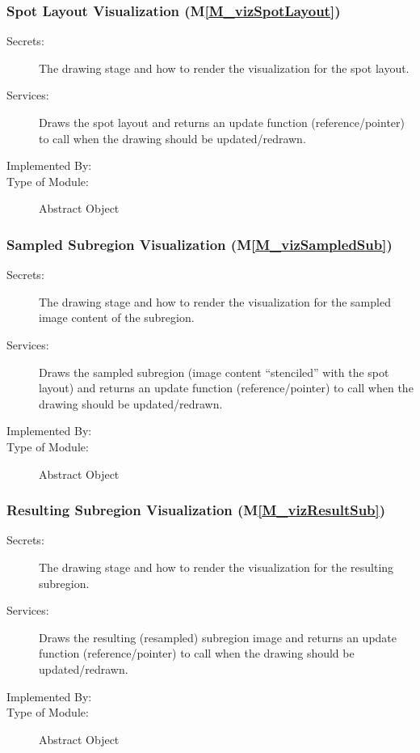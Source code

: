 \documentclass[12pt, titlepage]{article}
\newcommand{\mref}[1]{M\ref{#1}}
\begin{document}
\subsubsection{Spot Layout Visualization (\mref{M_vizSpotLayout})}
\begin{description}
\item[Secrets:] The drawing stage and how to render the visualization for the spot layout.
\item[Services:] Draws the spot layout and returns an update function (reference/pointer)
  to call when the drawing should be updated/redrawn.
\item[Implemented By:] \progname{}
\item[Type of Module:] Abstract Object
\end{description}


\subsubsection{Sampled Subregion Visualization (\mref{M_vizSampledSub})}
\begin{description}
\item[Secrets:] The drawing stage and how to render the visualization for
  the sampled image content of the subregion.
\item[Services:] Draws the sampled subregion (image content ``stenciled'' with the spot layout)
  and returns an update function (reference/pointer) to call when the drawing should be updated/redrawn.
\item[Implemented By:] \progname{}
\item[Type of Module:] Abstract Object
\end{description}


\subsubsection{Resulting Subregion Visualization (\mref{M_vizResultSub})}
\begin{description}
\item[Secrets:] The drawing stage and how to render the visualization for
  the resulting subregion.
\item[Services:] Draws the resulting (resampled) subregion image 
  and returns an update function (reference/pointer) to call when the drawing
  should be updated/redrawn.
\item[Implemented By:] \progname{}
\item[Type of Module:] Abstract Object
\end{description}
\end{document}
